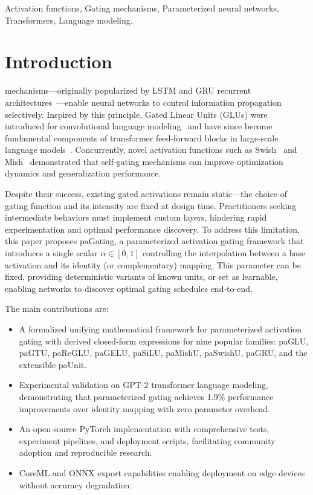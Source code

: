 \documentclass[lettersize,journal]{IEEEtran}
\begin{document}
\begin{IEEEkeywords}
Activation functions, Gating mechanisms, Parameterized neural networks, Transformers, Language modeling.
\end{IEEEkeywords}

\section{Introduction}
 mechanisms—originally popularized by LSTM and GRU recurrent architectures~\cite{hochreiter1997long,cho2014learning}—enable neural networks to control information propagation selectively. Inspired by this principle, Gated Linear Units (GLUs) were introduced for convolutional language modeling~\cite{dauphin2017language} and have since become fundamental components of transformer feed-forward blocks in large-scale language models~\cite{shazeer2020glu}. Concurrently, novel activation functions such as Swish~\cite{ramachandran2017searching} and Mish~\cite{misra2019mish} demonstrated that self-gating mechanisms can improve optimization dynamics and generalization performance.

Despite their success, existing gated activations remain static—the choice of gating function and its intensity are fixed at design time. Practitioners seeking intermediate behaviors must implement custom layers, hindering rapid experimentation and optimal performance discovery. To address this limitation, this paper proposes paGating, a parameterized activation gating framework that introduces a single scalar $\alpha \in [0,1]$ controlling the interpolation between a base activation and its identity (or complementary) mapping. This parameter can be fixed, providing deterministic variants of known units, or set as learnable, enabling networks to discover optimal gating schedules end-to-end.

The main contributions are:
\begin{itemize}
\item A formalized unifying mathematical framework for parameterized activation gating with derived closed-form expressions for nine popular families: paGLU, paGTU, paReGLU, paGELU, paSiLU, paMishU, paSwishU, paGRU, and the extensible paUnit.
\item Experimental validation on GPT-2 transformer language modeling, demonstrating that parameterized gating achieves 1.9\% performance improvements over identity mapping with zero parameter overhead.
\item An open-source PyTorch implementation with comprehensive tests, experiment pipelines, and deployment scripts, facilitating community adoption and reproducible research.
\item CoreML and ONNX export capabilities enabling deployment on edge devices without accuracy degradation.
\end{itemize}
\end{document}
